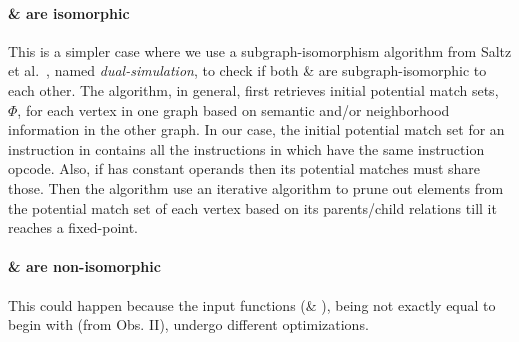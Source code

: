 \paragraph{\textup{\GN} \& \textup{\GNP} are isomorphic} 
This is a simpler case where we use a subgraph-isomorphism algorithm from Saltz 
et al.~\cite{Saltz2014}, named 
\emph{dual-simulation},  to check if both \GN \& \GNP are 
subgraph-isomorphic to each other. The algorithm, in general, first 
retrieves initial potential match sets, $\Phi$,  for each vertex in one 
graph based on semantic and/or neighborhood information in the other graph.
 In our case, the initial potential match set for an instruction 
\IN in \GN contains all the instructions in \GNP which have the same 
instruction opcode. Also, if \IN has constant operands then its potential 
matches must share 
those.  
Then the algorithm use an iterative algorithm to prune out elements from the 
potential match 
set of each vertex based on its parents/child relations till it reaches a 
fixed-point.


\paragraph{\textup{\GN} \& \textup{\GNP} are non-isomorphic} 
This could happen because the input functions (\F \& \FP), being not exactly 
equal to begin with (from Obs. II), undergo different 
optimizations. 

